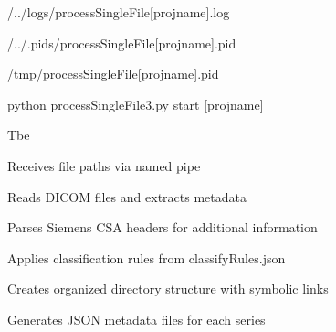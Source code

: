 \documentclass[letterpaper,10pt,english]{sphinxmanual}
\begin{document}
\sphinxAtStartPar
{}

\begin{DUlineblock}{0em}
\item[] \sphinxhyphen{} 
\item[] \sphinxhyphen{} 
\item[] \sphinxhyphen{}  /../logs/processSingleFile{[}projname{]}.log
\item[] \sphinxhyphen{} 
\item[]
\begin{DUlineblock}{\DUlineblockindent}
\item[] \sphinxhyphen{}        /../.pids/processSingleFile{[}projname{]}.pid
\item[] \sphinxhyphen{}       /tmp/processSingleFile{[}projname{]}.pid
\end{DUlineblock}
\item[] \sphinxhyphen{}  python processSingleFile3.py start {[}projname{]}
\item[] \sphinxhyphen{}  Tbe
\end{DUlineblock}

\sphinxAtStartPar
{}

\begin{DUlineblock}{0em}
\item[] \sphinxhyphen{} Receives file paths via named pipe
\item[] \sphinxhyphen{} Reads DICOM files and extracts metadata
\item[] \sphinxhyphen{} Parses Siemens CSA headers for additional information
\item[] \sphinxhyphen{} Applies classification rules from classifyRules.json
\item[] \sphinxhyphen{} Creates organized directory structure with symbolic links
\item[] \sphinxhyphen{} Generates JSON metadata files for each series
\end{DUlineblock}

\sphinxAtStartPar
{}


\sphinxAtStartPar
{}
\end{document}

